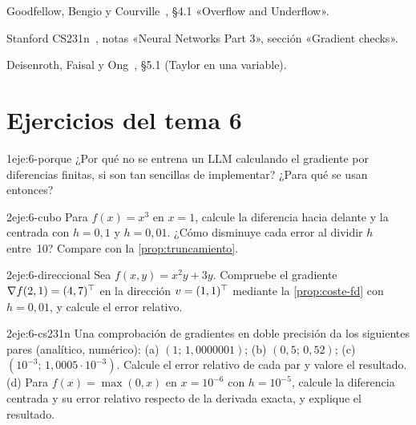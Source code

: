 \begin{lecturas}
\item Goodfellow, Bengio y Courville~\cite{gbc}, §4.1 «Overflow and Underflow».
\item Stanford CS231n~\cite{cs231n}, notas «Neural Networks Part 3», sección «Gradient checks».
\item Deisenroth, Faisal y Ong~\cite{mml}, §5.1 (Taylor en una variable).
\end{lecturas}

\section*{Ejercicios del tema 6}

\begin{ejercicio}{1}{eje:6-porque}
¿Por qué no se entrena un LLM calculando el gradiente por diferencias finitas, si son tan sencillas de implementar? ¿Para qué se usan entonces?
\end{ejercicio}

\begin{ejercicio}{2}{eje:6-cubo}
Para $f(x)=x^{3}$ en $x=1$, calcule la diferencia hacia delante y la centrada con $h=0{,}1$ y $h=0{,}01$. ¿Cómo disminuye cada error al dividir $h$ entre~10? Compare con la \cref{prop:truncamiento}.
\end{ejercicio}

\begin{ejercicio}{2}{eje:6-direccional}
Sea $f(x,y)=x^{2}y+3y$. Compruebe el gradiente $\nabla f(2,1)=(4,7)^{\top}$ en la dirección $v=(1,1)^{\top}$ mediante la \cref{prop:coste-fd} con $h=0{,}01$, y calcule el error relativo.
\end{ejercicio}

\begin{ejercicio}{2}{eje:6-cs231n}
Una comprobación de gradientes en doble precisión da los siguientes pares (analítico, numérico): (a) $(1;\,1{,}0000001)$; (b) $(0{,}5;\,0{,}52)$; (c) $(10^{-3};\,1{,}0005\cdot 10^{-3})$. Calcule el error relativo de cada par y valore el resultado. (d) Para $f(x)=\max(0,x)$ en $x=10^{-6}$ con $h=10^{-5}$, calcule la diferencia centrada y su error relativo respecto de la derivada exacta, y explique el resultado.
\end{ejercicio}


